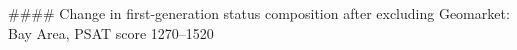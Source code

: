 #### Change in first-generation status composition after excluding Geomarket: Bay Area, PSAT score 1270–1520
